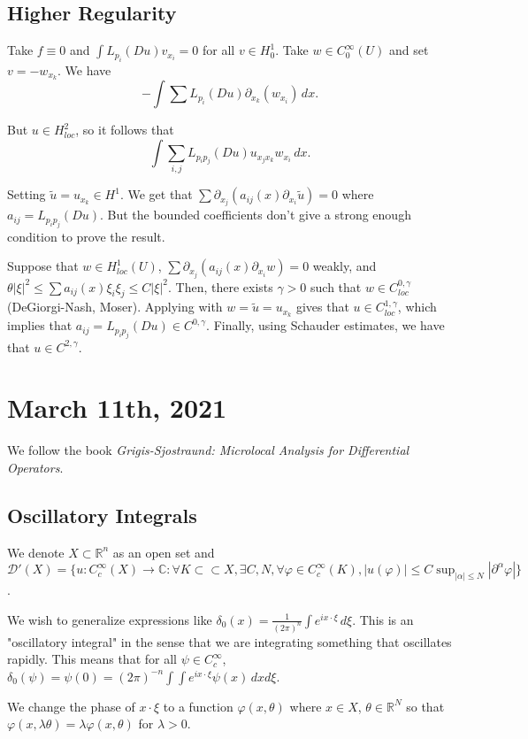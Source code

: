 \documentclass[12pt]{scrartcl}
\newcommand{\R}{\mathbb{R}}
\newcommand{\C}{\mathbb C}
\newcommand{\<}{\langle}
\renewcommand{\>}{\rangle}
\let \phi \varphi
\let \mc \mathcal
\begin{document}
\subsection{Higher Regularity}
Take $f \equiv 0$ and $\int L_{p_i}(Du) v_{x_i} = 0$ for all $v \in H_0^1$.  Take $w \in C_0^\infty(U)$ and set $v = -w_{x_k}$.  We have
$$-\int \sum L_{p_i}(Du)\partial_{x_k}(w_{x_i})\,dx.$$

But $u \in H_{loc}^2$, so it follows that 
$$\int \sum_{i, j} L_{p_i p_j}(Du) u_{x_j x_k} w_{x_i}\,dx.$$

Setting $\tilde{u} = u_{x_k} \in H^1$.  We get that $\sum \partial_{x_j}(a_{ij}(x)\partial_{x_i} \tilde{u}) = 0$ where $a_{ij} = L_{p_i p_j}(Du)$.  But the bounded coefficients don't give a strong enough condition to prove the result.  

\begin{theorem} Suppose that $w \in H_{loc}^1(U)$, $\sum \partial_{x_j}(a_{ij}(x)\partial_{x_i}w) = 0$ weakly, and $\theta|\xi|^2 \le \sum a_{ij}(x) \xi_i \xi_j \le C |\xi|^2$.   Then, there exists $\gamma > 0$ such that $w \in C_{loc}^{0, \gamma}$(DeGiorgi-Nash, Moser).  Applying with $w = \tilde{u} = u_{x_k} $ gives that $u \in C_{loc}^{1, \gamma}$, which implies that $a_{ij} = L_{p_i p_j}(Du) \in C^{0, \gamma}$.  Finally, using Schauder estimates, we have that $u \in C^{2, \gamma}$.  
\end{theorem}
\pagebreak
\section{March 11th, 2021}
We follow the book \textit{Grigis-Sjostraund: Microlocal Analysis for Differential Operators}. 
\subsection{Oscillatory Integrals}
 We denote $X \subset \R^n$ as an open set and $\mc D'(X) =\{u: C_c^\infty(X) \to \C: \forall K \subset \subset X, \exists C, N, \forall \phi \in C_c^\infty(K), |u(\phi)| \le C\sup_{|\alpha| \le N}|\partial^\alpha \phi|\}$.

We wish to generalize expressions like $\delta_0(x) = \frac{1}{(2\pi)^n} \int e^{ix \cdot \xi}\,d\xi$.  This is an "oscillatory integral" in the sense that we are integrating something that oscillates rapidly.   This means that for all $\psi \in C_c^\infty$, $\delta_0(\psi) = \psi(0) = (2\pi)^{-n} \int \int e^{ix \cdot \xi} \psi(x)\,dx d\xi$.

We change the phase of $x \cdot \xi$ to a function $\phi(x, \theta)$ where $x \in X$, $\theta \in \R^N$ so that $\phi(x, \lambda \theta) = \lambda \phi(x, \theta)$ for $\lambda > 0$.
\end{document}

